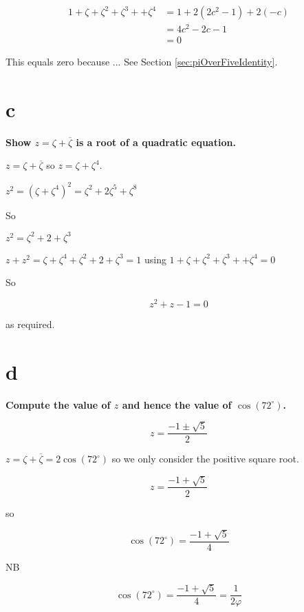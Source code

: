 \documentclass[11pt]{amsart}
\begin{document}
$$
\begin{aligned}
1 + \zeta + \zeta^{2} + \zeta^{3} + + \zeta^{4} 
&= 
1 + 2 (2 c^{2} - 1) + 2(-c)
\\
&=
4 c^{2}  - 2c - 1
\\
&=
0
\end{aligned}
$$

This equals zero because ... See Section \ref{sec:piOverFiveIdentity}.


\section{c}

\textbf{
Show $z = \zeta + \overline{\zeta}$ is a root of a quadratic equation.
}

\vspace{1em}

$z = \zeta + \overline{\zeta}$ so $z = \zeta +  \zeta^{4}$.

$z^{2} = (\zeta +  \zeta^{4})^{2} = \zeta^{2} + 2 \zeta^{5} + \zeta^{8}$

So

$z^{2} = \zeta^{2} + 2  + \zeta^{3}$

$z + z^{2} = \zeta + \zeta^{4} + \zeta^{2} + 2 + \zeta^{3} = 1$
%
using 
$1 + \zeta + \zeta^{2} + \zeta^{3} + + \zeta^{4} = 0$

So

$$
z^{2} + z - 1 = 0
$$

as required.

\section{d}

\textbf{
Compute the value of $z$ and hence the value of $\cos (72^{\circ})$.
}

\vspace{1em}


$$
z = \frac{-1 \pm \sqrt{5}}{2}
$$

$z = \zeta + \overline{\zeta} = 2 \cos (72^{\circ})$ so we only consider the positive square root.

$$
z = \frac{-1 + \sqrt{5}}{2}
$$

so

$$
\cos(72^{\circ}) = \frac{-1 + \sqrt{5}}{4}
$$

NB 

$$
\cos(72^{\circ}) = \frac{-1 + \sqrt{5}}{4} = \frac{1}{ 2 \varphi}
$$
\end{document}
